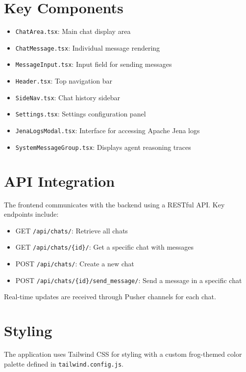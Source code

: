 \section*{Key Components}

\begin{itemize}
    \item \texttt{ChatArea.tsx}: Main chat display area
    \item \texttt{ChatMessage.tsx}: Individual message rendering
    \item \texttt{MessageInput.tsx}: Input field for sending messages
    \item \texttt{Header.tsx}: Top navigation bar
    \item \texttt{SideNav.tsx}: Chat history sidebar
    \item \texttt{Settings.tsx}: Settings configuration panel
    \item \texttt{JenaLogsModal.tsx}: Interface for accessing Apache Jena logs
    \item \texttt{SystemMessageGroup.tsx}: Displays agent reasoning traces
\end{itemize}

\section*{API Integration}

The frontend communicates with the backend using a RESTful API. Key endpoints include:

\begin{itemize}
    \item GET \texttt{/api/chats/}: Retrieve all chats
    \item GET \texttt{/api/chats/\{id\}/}: Get a specific chat with messages
    \item POST \texttt{/api/chats/}: Create a new chat
    \item POST \texttt{/api/chats/\{id\}/send\_message/}: Send a message in a specific chat
\end{itemize}

Real-time updates are received through Pusher channels for each chat.

\section*{Styling}

The application uses Tailwind CSS for styling with a custom frog-themed color palette defined in \texttt{tailwind.config.js}.

